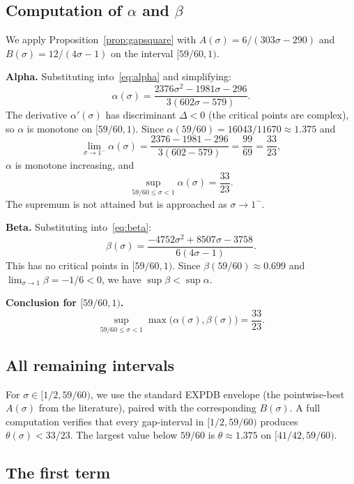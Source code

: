 \documentclass[11pt,a4paper]{amsart}
\theoremstyle{plain}
\theoremstyle{definition}
\begin{document}
\subsection{Computation of $\alpha$ and $\beta$}

We apply Proposition~\ref{prop:gapsquare} with $A(\sigma) = 6/(303\sigma - 290)$ and $B(\sigma) = 12/(4\sigma - 1)$ on the interval $[59/60, 1)$.

\medskip

\textbf{Alpha.} Substituting into~\eqref{eq:alpha} and simplifying:
\begin{equation}\label{eq:alpha_explicit}
\alpha(\sigma) = \frac{2376\sigma^2 - 1981\sigma - 296}{3(602\sigma - 579)}.
\end{equation}
The derivative $\alpha'(\sigma)$ has discriminant $\Delta < 0$ (the critical points are complex), so $\alpha$ is monotone on $[59/60, 1)$. Since $\alpha(59/60) = 16043/11670 \approx 1.375$ and
\[
\lim_{\sigma \to 1^-} \alpha(\sigma) = \frac{2376 - 1981 - 296}{3(602 - 579)} = \frac{99}{69} = \frac{33}{23},
\]
$\alpha$ is monotone increasing, and
\[
\sup_{59/60 \leq \sigma < 1} \alpha(\sigma) = \frac{33}{23}.
\]
The supremum is not attained but is approached as $\sigma \to 1^-$.

\medskip

\textbf{Beta.} Substituting into~\eqref{eq:beta}:
\[
\beta(\sigma) = \frac{-4752\sigma^2 + 8507\sigma - 3758}{6(4\sigma - 1)}.
\]
This has no critical points in $[59/60, 1)$. Since $\beta(59/60) \approx 0.699$ and $\lim_{\sigma \to 1} \beta = -1/6 < 0$, we have $\sup \beta < \sup \alpha$.

\medskip

\textbf{Conclusion for $[59/60,1)$.}
\[
\sup_{59/60 \leq \sigma < 1} \max\bigl(\alpha(\sigma), \beta(\sigma)\bigr) = \frac{33}{23}.
\]

\subsection{All remaining intervals}

For $\sigma \in [1/2, 59/60)$, we use the standard EXPDB envelope (the pointwise-best $A(\sigma)$ from the literature), paired with the corresponding $B(\sigma)$. A full computation verifies that every gap-interval in $[1/2, 59/60)$ produces $\theta(\sigma) < 33/23$. The largest value below $59/60$ is $\theta \approx 1.375$ on $[41/42, 59/60)$.

\subsection{The first term}
\end{document}
